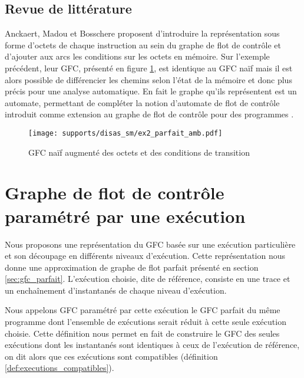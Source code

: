\FloatBarrier
\subsection{Revue de littérature}
Anckaert, Madou et Bosschere \cite{AMB06} proposent d'introduire la représentation sous forme d'octets de chaque instruction au sein du graphe de flot de contrôle et d'ajouter aux arcs les conditions sur les octets en mémoire. Sur l'exemple précédent, leur GFC, présenté en figure \ref{fig:sm_cfg_parfait_amb}, est identique au GFC naïf mais il est alors possible de différencier les chemins selon l'état de la mémoire et donc plus précis pour une analyse automatique.
En fait le graphe qu'ils représentent est un automate, permettant de compléter la notion d'automate de flot de contrôle introduit comme extension au graphe de flot de contrôle \cite{HJMS02} pour des programmes \sms.

\begin{figure}[h]
\begin{center}
  \texttt{[image: supports/disas\_sm/ex2\_parfait\_amb.pdf]}
\end{center}
\caption{GFC naïf augmenté des octets et des conditions de transition}
\label{fig:sm_cfg_parfait_amb}
\end{figure}

\section{Graphe de flot de contrôle paramétré par une exécution}
Nous proposons une représentation du GFC basée sur une exécution particulière et son découpage en différents niveaux d'exécution.
Cette représentation nous donne une approximation de graphe de flot parfait présenté en section \ref{sec:gfc_parfait}.
L'exécution choisie, dite de référence, consiste en une trace et un enchaînement d'instantanés de chaque niveau d'exécution.

Nous appelons GFC paramétré par cette exécution le GFC parfait du même programme dont l'ensemble de exécutions serait réduit à cette seule exécution choisie.
Cette définition nous permet en fait de construire le GFC des seules exécutions dont les instantanés sont identiques à ceux de l'exécution de référence, on dit alors que ces exécutions sont compatibles (définition \ref{def:executions_compatibles}).

